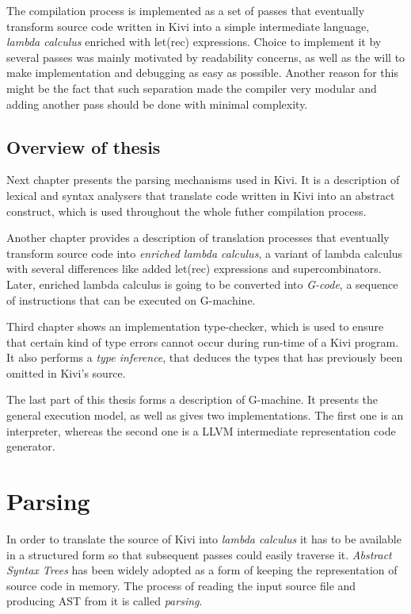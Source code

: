 \documentclass[12pt,a4paper]{report}
\begin{document}
The compilation process is implemented as a set of passes that eventually
transform source code written in Kivi into a simple intermediate language,
\textit{lambda calculus} enriched with let(rec) expressions. Choice to
implement it by several passes was mainly motivated by readability concerns, as
well as the will to make implementation and debugging as easy as possible.
Another reason for this might be the fact that such separation made the
compiler very modular and adding another pass should be done with minimal
complexity.

\section{Overview of thesis}
Next chapter presents the parsing mechanisms used in Kivi. It is a description
of lexical and syntax analysers that translate code written in Kivi into an
abstract construct, which is used throughout the whole futher compilation
process.

Another chapter provides a description of translation processes that eventually
transform source code into \textit{enriched lambda calculus}, a variant of
lambda calculus with several differences like added let(rec) expressions and
supercombinators. Later, enriched lambda calculus is going to be converted
into \textit{G-code}, a sequence of instructions that can be executed on
G-machine.

Third chapter shows an implementation type-checker, which is used to ensure
that certain kind of type errors cannot occur during run-time of a Kivi
program. It also performs a \textit{type inference}, that deduces the types
that has previously been omitted in Kivi's source.

The last part of this thesis forms a description of G-machine. It presents the
general execution model, as well as gives two implementations. The first one is
an interpreter, whereas the second one is a LLVM intermediate representation
code generator.

\chapter{Parsing}

In order to translate the source of Kivi into \textit{lambda calculus} it has
to be available in a structured form so that subsequent passes could easily
traverse it. \textit{Abstract Syntax Trees}\cite{ALSU07} has been widely
adopted as a form of keeping the representation of source code in memory. The
process of reading the input source file and producing AST from it is called
\textit{parsing}.
\end{document}
